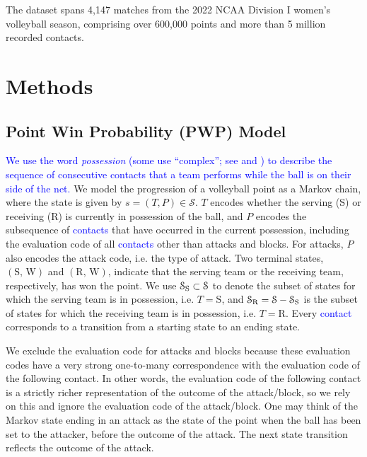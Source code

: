 \documentclass[USenglish]{article}
\theoremstyle{dgthm}
\theoremstyle{dgdef}
\begin{document}
The dataset spans 4,147 matches from the 2022 NCAA Division I women's volleyball season, comprising over 600,000 points and more than 5 million recorded contacts.


\section{Methods}

\subsection{Point Win Probability (PWP) Model}
\label{sec:point-win-prob}

\textcolor{blue}{We use the word {\it possession} (some use ``complex''; see \textcite{hileno_etal_2020} and \textcite{laporta_etal_2015}) to describe the sequence of consecutive contacts that a team performs while the ball is on their side of the net.} We model the progression of a volleyball point as a Markov chain, where the state is given by $s = (T, P) \in \mathcal{S}$. $T$ encodes whether the serving (S) or receiving (R) is currently in possession of the ball, and $P$ encodes the subsequence of \textcolor{blue}{contacts} that have occurred in the current possession, including the evaluation code of all \textcolor{blue}{contacts} other than attacks and blocks. For attacks, $P$ also encodes the attack code, i.e. the type of attack. Two terminal states, $(\mbox{S, W})$ and $(\mbox{R, W})$, indicate that the serving team or the receiving team, respectively, has won the point. We use $\mathcal{S}_{\mbox{\scriptsize S}} \subset \mathcal{S}$ to denote the subset of states for which the serving team is in possession, i.e. $T = \mbox{S}$, and $\mathcal{S}_{\mbox{\scriptsize R}} = \mathcal{S} - \mathcal{S}_{\mbox{\scriptsize S}}$ is the subset of states for which the receiving team is in possession, i.e. $T = \mbox{R}$. Every \textcolor{blue}{contact} corresponds to a transition from a starting state to an ending state.

We exclude the evaluation code for attacks and blocks because these evaluation codes have a very strong one-to-many correspondence with the evaluation code of the following contact. In other words, the evaluation code of the following contact is a strictly richer representation of the outcome of the attack/block, so we rely on this and ignore the evaluation code of the attack/block. One may think of the Markov state ending in an attack as the state of the point when the ball has been set to the attacker, before the outcome of the attack. The next state transition reflects the outcome of the attack.
\end{document}
